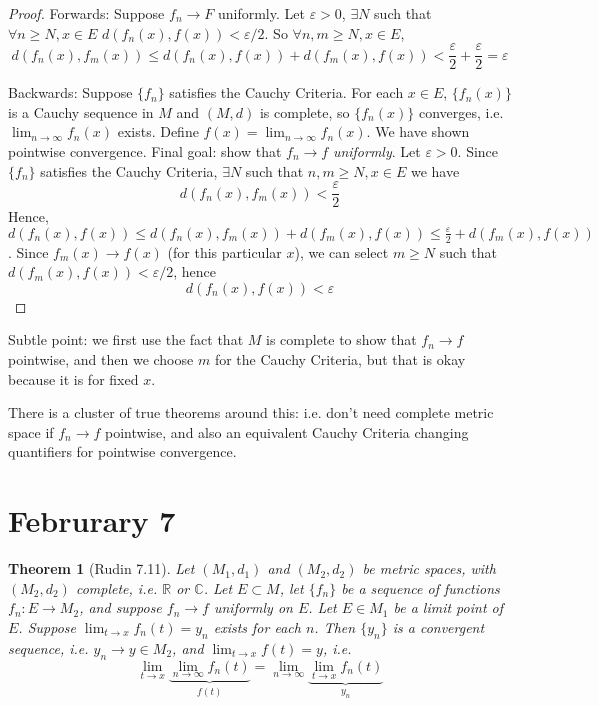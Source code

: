 \documentclass{article}
\theoremstyle{plain}
\newtheorem{theorem}{Theorem}
\theoremstyle{remark}
\newcommand{\R}{{\mathbb R}}
\newcommand{\C}{{\mathbb C}}
\newcommand{\ep}{{\varepsilon}}
\begin{document}
\begin{proof}
	Forwards: Suppose $f_n \to F$ uniformly.
	Let $\ep > 0$, $\exists N$ such that $\forall n \geq N, x \in E$
	$d(f_n(x), f(x)) < \ep/2$.
	So $\forall n,m \geq N, x \in E$,
	\[
		d(f_n(x),f_m(x)) \leq d(f_n(x),f(x)) + d(f_m(x),f(x)) <
		\frac{\ep}{2} + \frac{\ep}{2} = \ep
	\]

	Backwards: Suppose $\{f_n\}$ satisfies the Cauchy Criteria.
	For each $x \in E$, $\{f_n(x)\}$ is a Cauchy sequence in $M$
	and $(M,d)$ is complete, so $\{f_n(x)\}$ converges,
	i.e. $\lim_{n\to\infty} f_n(x)$ exists.
	Define $f(x) = \lim_{n\to\infty} f_n(x)$.
	We have shown pointwise convergence.
	Final goal: show that $f_n \to f$ \emph{uniformly}.
	Let $\ep > 0$. Since $\{f_n\}$ satisfies the Cauchy Criteria,
	$\exists N$ such that $n,m \geq N, x \in E$ we have
	\[
		d(f_n(x), f_m(x)) < \frac{\ep}{2}
	\]
	Hence, $d(f_n(x),f(x)) \leq d(f_n(x), f_m(x)) + d(f_m(x),f(x))
	\leq \frac{\ep}{2} + d(f_m(x),f(x))$.
	Since $f_m(x) \to f(x)$ (for this particular $x$),
	we can select $m \geq N$ such that $d(f_m(x),f(x)) < \ep/2$, hence
	\[
		d(f_n(x), f(x)) < \ep
	\]
\end{proof}
Subtle point: we first use the fact that $M$ is complete to show that
$f_n \to f$ pointwise, and then we choose $m$ for the Cauchy Criteria,
but that is okay because it is for fixed $x$.

There is a cluster of true theorems around this:
i.e. don't need complete metric space if $f_n \to f$ pointwise,
and also an equivalent Cauchy Criteria changing quantifiers for pointwise convergence.

\section{Februrary 7}
\begin{theorem}[Rudin 7.11]
	Let $(M_1,d_1)$ and $(M_2,d_2)$ be metric spaces, with
	$(M_2,d_2)$ complete, i.e. $\R$ or $\C$.
	Let $E \subset M$, let $\{f_n\}$ be a sequence of functions
	$f_n \colon E \to M_2$, and suppose $f_n \to f$ uniformly on $E$.
	Let $E \in M_1$ be a limit point of $E$.
	Suppose $\lim_{t\to x}f_n(t) = y_n$ exists for each $n$.
	Then $\{y_n\}$ is a convergent sequence, i.e. $y_n \to y \in M_2$,
	and $\lim_{t\to x}f(t) = y$, i.e.
	\[
		\lim_{t \to x}\underbrace{\lim_{n \to \infty} f_n(t)}_{f(t)} =
		\lim_{n\to\infty} \underbrace{\lim_{t \to x} f_n(t)}_{y_n}
	\]
\end{theorem}
\end{document}
